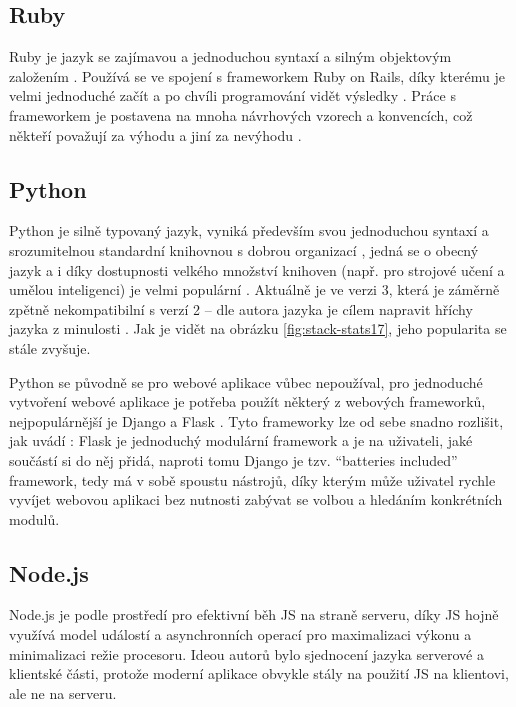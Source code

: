         \subsection{Ruby}
        Ruby je jazyk se zajímavou a jednoduchou syntaxí a silným objektovým založením \cite{tech-ruby1}.
        Používá se ve spojení s frameworkem Ruby on Rails, díky kterému je velmi jednoduché začít a po chvíli programování vidět výsledky \cite{tech1}. Práce s frameworkem je postavena na mnoha návrhových vzorech a konvencích, což někteří považují za výhodu \cite{tech1} a jiní za nevýhodu \cite{tech-ruby2}.
        
        \subsection{Python}\label{sec:python}
        Python je silně typovaný jazyk, vyniká především svou jednoduchou syntaxí a srozumitelnou standardní knihovnou s dobrou organizací \cite{tech-python1}, jedná se o obecný jazyk a i díky dostupnosti velkého množství knihoven (např. pro strojové učení a umělou inteligenci) je velmi populární \cite{tech-python3}. Aktuálně je ve verzi 3, která je záměrně zpětně nekompatibilní s verzí 2 -- dle autora jazyka je cílem napravit hříchy jazyka z minulosti \cite{tech-python6}. Jak je vidět na obrázku \ref{fig:stack-stats17}, jeho popularita se stále zvyšuje.
        
        Python se původně se pro webové aplikace vůbec nepoužíval, pro jednoduché vytvoření webové aplikace je potřeba použít některý z webových frameworků, nejpopulárnější je Django a Flask \cite{tech-python4}. Tyto frameworky lze od sebe snadno rozlišit, jak uvádí \cite{tech-python5}: Flask je jednoduchý modulární framework a je na uživateli, jaké součástí si do něj přidá, naproti tomu Django je tzv. \enquote{batteries included} framework, tedy má v sobě spoustu nástrojů, díky kterým může uživatel rychle vyvíjet webovou aplikaci bez nutnosti zabývat se volbou a hledáním konkrétních modulů.
        
        \subsection{Node.js}\label{nodejs}
        Node.js je podle \cite{tech1} prostředí pro efektivní běh JS na straně serveru, díky JS hojně využívá model událostí a asynchronních operací pro maximalizaci výkonu a minimalizaci režie procesoru. Ideou autorů bylo sjednocení jazyka serverové a klientské části, protože moderní aplikace obvykle stály na použití JS na klientovi, ale ne na serveru. 
        
